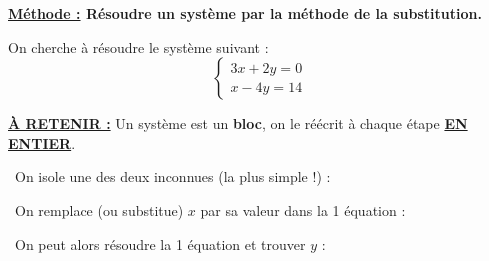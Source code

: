 \documentclass[12pt]{article}
\begin{document}
\vspace{5pt}

{\color{RedOrange}\textbf{\underline{Méthode :} Résoudre un système par la méthode de la substitution.}}

\vspace{5pt}
On cherche à résoudre le système suivant :
$$
\left\{
    \begin{array}{ll}
        3x + 2y = 0 \\
        x - 4y = 14
    \end{array}
\right.
$$

{\color{red}\underline{\textbf{À RETENIR :}}} Un système est un \textbf{bloc}, on le réécrit à chaque étape 
\underline{\textbf{EN ENTIER}}.

\vspace{5pt}
\textbullet \ On isole une des deux inconnues (la plus simple !) :

\vspace{0.5cm}
{\color{black!45}\dotfill}

\vspace{0.5cm}
{\color{black!45}\dotfill}

\vspace{0.5cm}
{\color{black!45}\dotfill}

\vspace{20pt}

\vspace{5pt}
\textbullet \ On remplace (ou substitue) $x$ par sa valeur dans la 1 équation : 

\vspace{0.5cm}
{\color{black!45}\dotfill}

\vspace{0.5cm}
{\color{black!45}\dotfill}

\vspace{0.5cm}
{\color{black!45}\dotfill}

\vspace{20pt}

\textbullet \ On peut alors résoudre la 1 équation et trouver $y$ : 

\vspace{0.5cm}
{\color{black!45}\dotfill}

\vspace{0.5cm}
{\color{black!45}\dotfill}

\vspace{0.5cm}
{\color{black!45}\dotfill}

\vspace{0.5cm}
{\color{black!45}\dotfill}
\end{document}
